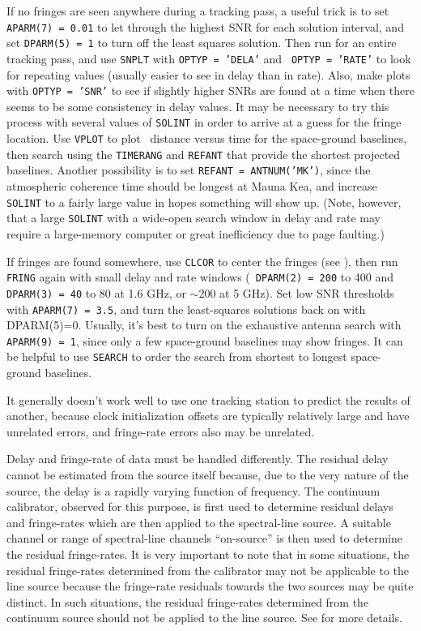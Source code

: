 If no fringes are seen anywhere during a tracking pass, a useful trick
is to set {\tt APARM(7) = 0.01} to let through the highest SNR for
each solution interval, and set {\tt DPARM(5) = 1} to turn off the
least squares solution.  Then run {\tt {}} for an entire
tracking pass, and use {\tt SNPLT} with {\tt OPTYP = 'DELA'} and {\tt
OPTYP = 'RATE'} to look for repeating values (usually easier to see in
delay than in rate).  Also, make plots with {\tt OPTYP = 'SNR'} to see
if slightly higher SNRs are found at a time when there seems to be
some consistency in delay values.  It may be necessary to try this
process with several values of {\tt SOLINT} in order to arrive at a
guess for the fringe location.  Use {\tt VPLOT} to plot \uv\ distance
versus time for the space-ground baselines, then search using the
{\tt TIMERANG} and {\tt REFANT} that provide the shortest projected
baselines.  Another possibility is to set {\tt REFANT = ANTNUM('MK')},
since the atmospheric coherence time should be longest at Mauna Kea,
and increase {\tt SOLINT} to a fairly large value in hopes something
will show up.  (Note, however, that a large {\tt SOLINT} with a
wide-open search window in delay and rate may require a large-memory
computer or great inefficiency due to page faulting.)

If fringes are found somewhere, use {\tt CLCOR} to center the fringes
(see ), then run {\tt FRING} again with small delay and
rate windows (\eg\ {\tt DPARM(2) = 200} to 400 and {\tt DPARM(3) = 40}
to 80 at 1.6 GHz, or $\sim 200$ at 5 GHz).  Set low SNR thresholds
with {\tt APARM(7) = 3.5}, and turn the least-squares solutions back
on with DPARM(5)=0.  Usually, it's best to turn on the exhaustive
antenna search with {\tt APARM(9) = 1}, since only a few space-ground
baselines may show fringes.  It can be helpful to use {\tt SEARCH} to
order the search from shortest to longest space-ground baselines.

It generally doesn't work well to use one tracking station to predict
the results of another, because clock initialization offsets are
typically relatively large and have unrelated errors, and fringe-rate
errors also may be unrelated.


Delay and fringe-rate  of 
 data must be handled differently.  The residual delay
cannot be estimated from the source itself because, due to the very
nature of the source, the delay is a rapidly varying function of
frequency.  The continuum calibrator, observed for this purpose, is
first used to determine residual delays and fringe-rates which are
then applied to the spectral-line source.  A suitable channel or range
of spectral-line channels ``on-source'' is then used to determine the
residual fringe-rates.  It is very important to note that in some
situations, the residual fringe-rates determined from the calibrator
may not be applicable to the line source because the fringe-rate
residuals towards the two sources may be quite distinct.  In such
situations, the residual fringe-rates determined from the continuum
source should not be applied to the line source.  See 
for more details.

